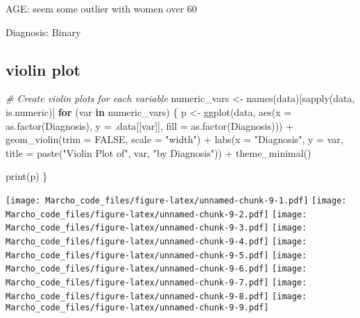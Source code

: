 \documentclass[
]{article}
\newenvironment{Shaded}{\begin{snugshade}}{\end{snugshade}}
\newcommand{\AttributeTok}[1]{\textcolor[rgb]{0.77,0.63,0.00}{#1}}
\newcommand{\CommentTok}[1]{\textcolor[rgb]{0.56,0.35,0.01}{\textit{#1}}}
\newcommand{\ConstantTok}[1]{\textcolor[rgb]{0.00,0.00,0.00}{#1}}
\newcommand{\ControlFlowTok}[1]{\textcolor[rgb]{0.13,0.29,0.53}{\textbf{#1}}}
\newcommand{\FunctionTok}[1]{\textcolor[rgb]{0.00,0.00,0.00}{#1}}
\newcommand{\NormalTok}[1]{#1}
\newcommand{\OtherTok}[1]{\textcolor[rgb]{0.56,0.35,0.01}{#1}}
\newcommand{\SpecialCharTok}[1]{\textcolor[rgb]{0.00,0.00,0.00}{#1}}
\newcommand{\StringTok}[1]{\textcolor[rgb]{0.31,0.60,0.02}{#1}}
\begin{document}
AGE: seem some outlier with women over 60

Diagnosis: Binary

\hypertarget{violin-plot}{%
\subsection{violin plot}\label{violin-plot}}

\begin{Shaded}
\begin{Highlighting}[]
\CommentTok{\# Create violin plots for each variable}
\NormalTok{numeric\_vars }\OtherTok{\textless{}{-}} \FunctionTok{names}\NormalTok{(data)[}\FunctionTok{sapply}\NormalTok{(data, is.numeric)]}
\ControlFlowTok{for}\NormalTok{ (var }\ControlFlowTok{in}\NormalTok{ numeric\_vars) \{}
\NormalTok{  p }\OtherTok{\textless{}{-}} \FunctionTok{ggplot}\NormalTok{(data, }\FunctionTok{aes}\NormalTok{(}\AttributeTok{x =} \FunctionTok{as.factor}\NormalTok{(Diagnosis), }\AttributeTok{y =}\NormalTok{ .data[[var]], }\AttributeTok{fill =} \FunctionTok{as.factor}\NormalTok{(Diagnosis))) }\SpecialCharTok{+}
    \FunctionTok{geom\_violin}\NormalTok{(}\AttributeTok{trim =} \ConstantTok{FALSE}\NormalTok{, }\AttributeTok{scale =} \StringTok{"width"}\NormalTok{) }\SpecialCharTok{+}
    \FunctionTok{labs}\NormalTok{(}\AttributeTok{x =} \StringTok{"Diagnosis"}\NormalTok{, }\AttributeTok{y =}\NormalTok{ var, }\AttributeTok{title =} \FunctionTok{paste}\NormalTok{(}\StringTok{"Violin Plot of"}\NormalTok{, var, }\StringTok{"by Diagnosis"}\NormalTok{)) }\SpecialCharTok{+}
    \FunctionTok{theme\_minimal}\NormalTok{()}
  
  \FunctionTok{print}\NormalTok{(p)}
\NormalTok{\}}
\end{Highlighting}
\end{Shaded}

\texttt{[image: Marcho\_code\_files/figure-latex/unnamed-chunk-9-1.pdf]}
\texttt{[image: Marcho\_code\_files/figure-latex/unnamed-chunk-9-2.pdf]}
\texttt{[image: Marcho\_code\_files/figure-latex/unnamed-chunk-9-3.pdf]}
\texttt{[image: Marcho\_code\_files/figure-latex/unnamed-chunk-9-4.pdf]}
\texttt{[image: Marcho\_code\_files/figure-latex/unnamed-chunk-9-5.pdf]}
\texttt{[image: Marcho\_code\_files/figure-latex/unnamed-chunk-9-6.pdf]}
\texttt{[image: Marcho\_code\_files/figure-latex/unnamed-chunk-9-7.pdf]}
\texttt{[image: Marcho\_code\_files/figure-latex/unnamed-chunk-9-8.pdf]}
\texttt{[image: Marcho\_code\_files/figure-latex/unnamed-chunk-9-9.pdf]}
\end{document}
